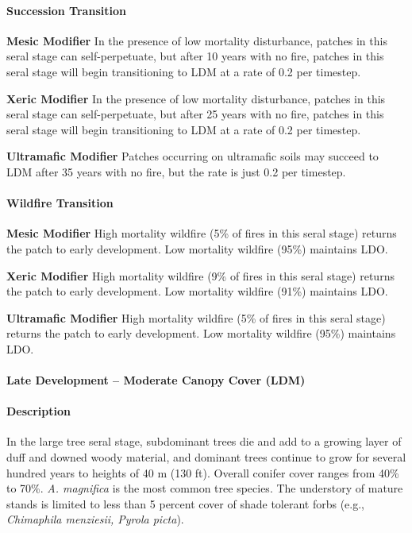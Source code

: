 \paragraph{Succession Transition}
\begin{adjustwidth}{2cm}{}
\noindent \textbf{Mesic Modifier } In the presence of low mortality disturbance, patches in this seral stage can self-perpetuate, but after 10 years with no fire, patches in this seral stage will begin transitioning to LDM at a rate of 0.2 per timestep.

\medskip
\noindent \textbf{Xeric Modifier}  In the presence of low mortality disturbance, patches in this seral stage can self-perpetuate, but after 25 years with no fire, patches in this seral stage will begin transitioning to LDM at a rate of 0.2 per timestep.

\medskip
\noindent \textbf{Ultramafic Modifier} Patches occurring on ultramafic soils may succeed to LDM after 35 years with no fire, but the rate is just 0.2 per timestep.

\end{adjustwidth}

\paragraph{Wildfire Transition}
\begin{adjustwidth}{2cm}{}
\noindent \textbf{Mesic Modifier } High mortality wildfire (5\% of fires in this seral stage) returns the patch to early development. Low mortality wildfire (95\%) maintains LDO. 

\medskip
\noindent \textbf{Xeric Modifier} High mortality wildfire (9\% of fires in this seral stage) returns the patch to early development. Low mortality wildfire (91\%) maintains LDO. 

\medskip
\noindent \textbf{Ultramafic Modifier} High mortality wildfire (5\% of fires in this seral stage) returns the patch to early development. Low mortality wildfire (95\%) maintains LDO.

\end{adjustwidth}

\noindent\hrulefill

\paragraph{Late Development – Moderate Canopy Cover (LDM)}

\paragraph{Description} In the large tree seral stage, subdominant trees die and add to a growing layer of duff and downed woody material, and dominant trees continue to grow for several hundred years to heights of 40 m (130 ft). Overall conifer cover ranges from 40\% to 70\%. \emph{A. magnifica} is the most common tree species. The understory of mature stands is limited to less than 5 percent cover of shade tolerant forbs (e.g., \emph{Chimaphila menziesii, Pyrola picta}). 

